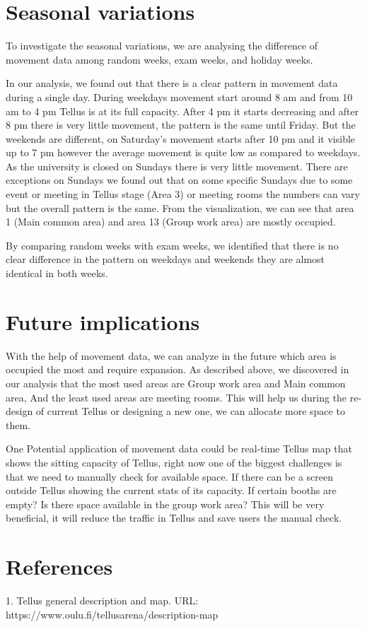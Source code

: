 \documentclass{article}
\begin{document}
\section{Seasonal variations}
To investigate the seasonal variations, we are analysing the difference of movement data among
random weeks, exam weeks, and holiday weeks.

In our analysis, we found out that there is a clear pattern in movement data during a single day.
During weekdays movement start around 8 am and from 10 am to 4 pm Tellus is at its full capacity.
After 4 pm it starts decreasing and after 8 pm there is very little movement, the pattern is the
same until Friday. But the weekends are different, on Saturday’s movement starts after 10 pm and it
visible up to 7 pm however the average movement is quite low as compared to weekdays. As the
university is closed on Sundays there is very little movement. There are exceptions on Sundays we
found out that on some specific Sundays due to some event or meeting in Tellus stage (Area 3) or
meeting rooms the numbers can vary but the overall pattern is the same. From the visualization, we
can see that area 1 (Main common area) and area 13 (Group work area) are mostly occupied.

By comparing random weeks with exam weeks, we identified that there is no clear difference in the
pattern on  weekdays and weekends they are almost identical in both weeks.


\section{Future implications}

With the help of movement data, we can analyze in the future which area is occupied the most and
require expansion. As described above, we discovered in our analysis that the most used areas are
Group work area and Main common area, And the least used areas are meeting rooms. This will help us
during the re-design of current Tellus or designing a new one, we can allocate more space to them.

One Potential application of movement data could be real-time Tellus map that shows the sitting
capacity of Tellus, right now one of the biggest challenges is that we need to manually check for
available space. If there can be a screen outside Tellus showing the current stats of its capacity.
If certain booths are empty? Is there space available in the group work area? This will be very
beneficial, it will reduce the traffic in Tellus and save users the manual check.


\section{References}

1. Tellus general description and map. URL: https://www.oulu.fi/tellusarena/description-map
\end{document}

